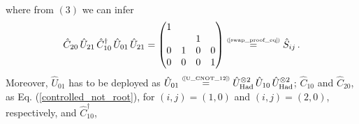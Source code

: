 \documentclass[11pt]{article}
\numberwithin{equation}{section} %
\numberwithin{figure}{section} %
\newcommand\numeq[1] %
  {\stackrel{\scriptscriptstyle(\mkern-1.5mu#1\mkern-1.5mu)}{=}}
\begin{document}
\begin{appendices}
\begin{equation}
\begin{split}
\end{split}
\end{equation}
where from $(3)$ we can infer
\begin{equation}
\hat{C}_{20}\,\hat{U}_{21}\,\hat{C}_{10}^\dagger\,\hat{U}_{01}\,\hat{U}_{21}=\begin{pmatrix}1&&&\\ &&1&\\0&1&0&0\\0&0&0&1\end{pmatrix}\numeq{\textrm{\ref{swap_proof_eq}}}\hat{S}_{ij}\,.
\end{equation}
Moreover, $\hat{U}_{01}$ has to be deployed as $\hat{U}_{01}\numeq{\textrm{\ref{U_CNOT_12}}} \hat{U}_{\textrm{Had}}^{\otimes 2}\,\hat{U}_{10}\,\hat{U}_{\textrm{Had}}^{\otimes 2}$;  $\hat{C}_{10}$ and $\hat{C}_{20}$, as Eq. (\ref{controlled_not_root}), for $(i,j)=(1,0)$ and $(i,j)=(2,0)$, respectively, and $\hat{C}_{10}^\dagger$,


\end{appendices}
\end{document}

